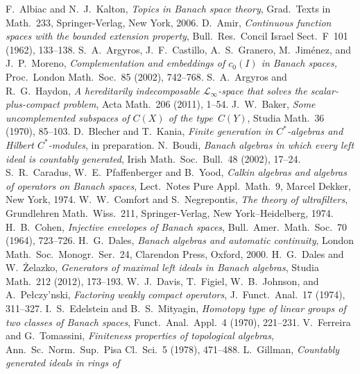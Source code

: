 \documentclass[12pt]{amsart}
\theoremstyle{definition}
\numberwithin{equation}{section}
\begin{document}
\begin{thebibliography}{99}
  F.~Albiac and N.~J.~Kalton, \emph{Topics in Banach space
  theory},  Grad.\ Texts in Math.~233, Springer-Verlag, New York, 2006.
 D.~Amir, \emph{Continuous function spaces with the bounded
  extension property}, {Bull.\ Res.\ Concil Israel
    Sect.~F}~{101} (1962), 133--138.
 S.~A.~Argyros, J.~F.~Castillo, A.~S.~Granero,
  M.~Jim\'{e}nez, and J.~P.~Moreno, \emph{Complementation and embeddings of
  $c_0(I)$ in Banach spaces,} {Proc.~London Math.\
    Soc.}~{85} (2002), 742--768.
 S.~A.~Argyros and R.~G.~Haydon, \emph{A hereditarily
    indecomposable $\mathscr{L}_\infty$-space that solves the
    scalar-plus-compact problem}, {Acta Math.}~{206} (2011), 1--54.
\bibitem{baker} J.~W.~Baker, \emph{Some uncomplemented subspaces of $C(X)$
  of the type~$C(Y)$}, {Studia Math.}~{36} (1970), 85--103.
 D.~Blecher and T.~Kania, \emph{Finite generation in
  $C^*$-algebras and Hilbert $C^*$-modules}, in preparation.
 N.~Boudi, \emph{Banach algebras in which every left ideal is
  countably generated}, {Irish Math.\ Soc.\ Bull.}~{48}
  (2002), 17--24.
 S.~R.~Caradus, W.~E.~Pfaffenberger and B.~Yood,
  \emph{Calkin algebras and algebras of operators on Banach spaces},
  Lect.\ Notes Pure Appl.\ Math.~9, Marcel Dekker, New York,
  1974.
 W.~W.~Comfort and S.~Negrepontis, \emph{The theory of
    ultrafilters}, Grundlehren Math.\ Wiss.~211, Springer-Verlag, New
  York--Heidelberg, 1974.
 H.~B.~Cohen, \emph{Injective envelopes of Banach spaces},
  {Bull.\ Amer.\ Math.\ Soc.}~{70} (1964), 723--726.
 H.~G.~Dales, \emph{Banach algebras and automatic
    continuity}, London Math.\ Soc.\ Monogr.\ Ser.~24, Clarendon Press,
  Oxford, 2000.   
 H.~G.~Dales and W.~\.{Z}elazko,
  \emph{Generators of maximal left ideals in Banach algebras}, {Studia
    Math.}~{212} (2012), 173--193.
 W.~J.~Davis, T.~Figiel, W.~B.~Johnson, and
  A.~Pe{\l}czy{\a'n}ski, \emph{Factoring weakly compact operators},
  {J.~Funct.\ Anal.}~{17} (1974), 311--327.
 I.~S.~Edelstein and B.~S.~Mityagin, \emph{Homotopy type of
  linear groups of two classes of Banach spaces}, {Funct.\
    Anal.~Appl.}~{4} (1970), 221--231.
\bibitem{ft} V.~Ferreira and G.~Tomassini, \emph{Finiteness properties of
  topological algebras}, {Ann.\ Sc.\ Norm.\ Sup.\
    Pisa Cl.\ Sci.}~{5} (1978), 471--488.
\bibitem{gillman} L.~Gillman, \emph{Countably generated ideals in rings of
}
\end{thebibliography}
\end{document}

